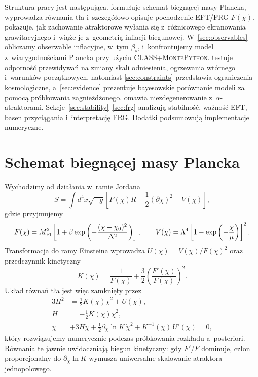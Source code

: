 \documentclass[11pt,a4paper]{article}
\begin{document}
Struktura pracy jest następująca.  formułuje schemat biegnącej masy Plancka, wyprowadza równania tła i~szczegółowo opisuje pochodzenie EFT/FRG $F(\chi)$.  pokazuje, jak zachowanie atraktorowe wyłania się z~różnicowego ekranowania grawitacyjnego i~wiąże je z~geometrią inflacji biegunowej. W~\cref{sec:observables} obliczamy obserwable inflacyjne, w~tym $\beta_s$, i~konfrontujemy model z~wiarygodnościami Plancka przy użyciu \textsc{CLASS}+\textsc{MontePython}.  testuje odporność przewidywań na zmiany skali odniesienia, ogrzewania wtórnego i~warunków początkowych, natomiast \cref{sec:constraints} przedstawia ograniczenia kosmologiczne, a~\cref{sec:evidence} prezentuje bayesowskie porównanie modeli za pomocą próbkowania zagnieżdżonego.  omawia niezdegenerowanie z~$\alpha$-atraktorami. Sekcje~\ref{sec:stability}--\ref{sec:frg} analizują stabilność, ważność EFT, basen przyciągania i~interpretację FRG. Dodatki podsumowują implementacje numeryczne.

\section{Schemat biegnącej masy Plancka}
\label{sec:framework}
Wychodzimy od działania w~ramie Jordana
\begin{equation}
S=\int d^{4}x\sqrt{-g}\left[ F(\chi)R-\frac{1}{2}(\partial\chi)^2-V(\chi) \right],
\end{equation}
gdzie przyjmujemy
\begin{equation}
F(\chi)=M_{\rm Pl}^{2}\left[1+\beta\exp\left(-\frac{(\chi-\chi_{0})^{2}}{\Delta^{2}}\right)\right], \qquad V(\chi)=\Lambda^{4}\left[1-\exp\left(-\frac{\chi}{\mu}\right)\right]^{2}.
\end{equation}
Transformacja do ramy Einsteina wprowadza $U(\chi)=V(\chi)/F(\chi)^{2}$ oraz przedczynnik kinetyczny
\begin{equation}
K(\chi)=\frac{1}{F(\chi)}+\frac{3}{2}\left(\frac{F'(\chi)}{F(\chi)}\right)^{2}.
\end{equation}
Układ równań tła jest więc zamknięty przez
\begin{align}
3H^{2} &= \frac{1}{2}K(\chi)\dot{\chi}^{2}+U(\chi), \label{eq:friedmann}\\
\dot{H} &= -\frac{1}{2}K(\chi)\dot{\chi}^{2}, \label{eq:raychaudhuri}\\
\ddot{\chi} &+3H\dot{\chi}+\frac{1}{2}\partial_{\chi}\ln K\,\dot{\chi}^{2}+K^{-1}(\chi)\,U'(\chi)=0, \label{eq:field}
\end{align}
który rozwiązujemy numerycznie podczas próbkowania rozkładu a~posteriori. Równania te jawnie uwidaczniają biegun kinetyczny: gdy $F'/F$ dominuje, człon proporcjonalny do $\partial_{\chi}\ln K$ wymusza uniwersalne skalowanie atraktora jednopolowego.
\end{document}
